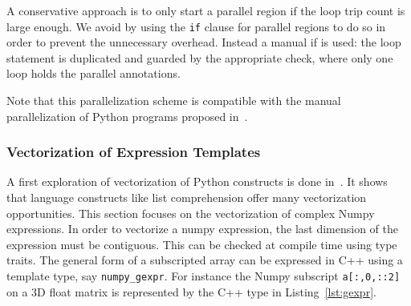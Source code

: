 \documentclass[10pt, preprint]{sigplanconf}
\begin{document}
%
%

A conservative approach is to only start a parallel region if the loop trip
count is large enough. We avoid by using the \texttt{if} clause for parallel
regions to do so in order to prevent the unnecessary overhead. Instead a manual
if is used: the loop statement is duplicated and guarded by the appropriate
check, where only one loop holds the parallel annotations.

Note that this parallelization scheme is compatible with the manual
parallelization of Python programs proposed in~\cite{pyhpc2013}.

\subsubsection{Vectorization of Expression Templates}

A first exploration of vectorization of Python constructs is done
in~\cite{wpmvp2014}. It shows that language constructs like list comprehension
offer many vectorization opportunities. This section focuses on the
vectorization of complex Numpy expressions. In order to vectorize a numpy
expression, the last dimension of the expression must be contiguous. This can
be checked at compile time using type traits. The general form of a subscripted
array can be expressed in C++ using a template type, say \texttt{numpy\_gexpr}.
For instance the Numpy subscript \lstinline|a[:,0,::2]| on a 3D float matrix is
represented by the C++ type in Listing~\ref{lst:gexpr}.
\end{document}
